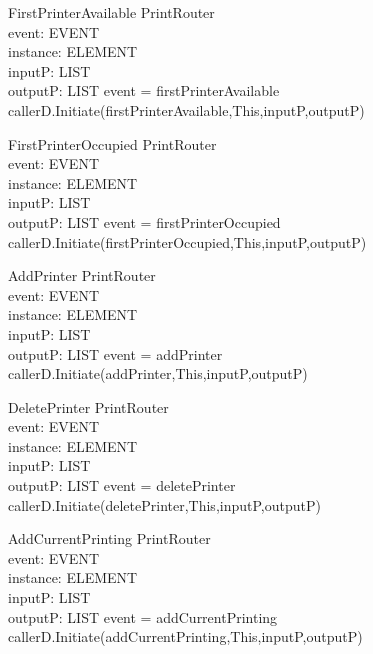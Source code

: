 \begin{schema}{FirstPrinterAvailable}
\Delta PrintRouter \\
event: EVENT \\
instance: ELEMENT \\
inputP: LIST \\
outputP: LIST
\where event = firstPrinterAvailable \\
callerD.Initiate(firstPrinterAvailable,This,inputP,outputP)
\end{schema}

\begin{schema}{FirstPrinterOccupied}
\Delta PrintRouter \\
event: EVENT \\
instance: ELEMENT \\
inputP: LIST \\
outputP: LIST
\where event = firstPrinterOccupied \\
callerD.Initiate(firstPrinterOccupied,This,inputP,outputP)
\end{schema}

\begin{schema}{AddPrinter}
\Delta PrintRouter \\
event: EVENT \\
instance: ELEMENT \\
inputP: LIST \\
outputP: LIST
\where event = addPrinter \\
callerD.Initiate(addPrinter,This,inputP,outputP)
\end{schema}

\begin{schema}{DeletePrinter}
\Delta PrintRouter \\
event: EVENT \\
instance: ELEMENT \\
inputP: LIST \\
outputP: LIST
\where event = deletePrinter \\
callerD.Initiate(deletePrinter,This,inputP,outputP)
\end{schema}

\begin{schema}{AddCurrentPrinting}
\Delta PrintRouter \\
event: EVENT \\
instance: ELEMENT \\
inputP: LIST \\
outputP: LIST
\where event = addCurrentPrinting \\
callerD.Initiate(addCurrentPrinting,This,inputP,outputP)
\end{schema}

